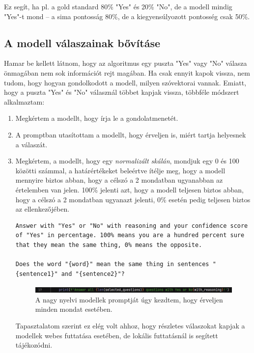 \documentclass[12pt]{report}
\theoremstyle{definition}
\begin{document}
Ez segít, ha pl. a gold standard 80\% "Yes" és 20\% "No", de a modell mindig "Yes"-t mond – a sima pontosság 80\%, de a kiegyensúlyozott pontosség csak 50\%.

\lstset{breaklines=true}

\subsection{A modell válaszainak bővításe}
Hamar be kellett látnom, hogy az algoritmus egy puszta "Yes" vagy "No" válasza önmagában nem sok információt rejt magában. Ha csak ennyit kapok vissza, nem tudom, hogy hogyan gondolkodott a modell, milyen szóvektorai vannak.
Emiatt, hogy a puszta "Yes" és "No" válasznál többet kapjak vissza, többféle módszert alkalmaztam:
\begin{enumerate}
    \item Megkértem a modellt, hogy írja le a gondolatmenetét.
	\item A promptban utasítottam a modellt, hogy érveljen is, miért tartja helyesnek a válaszát.
        \item Megkértem, a modellt, hogy egy \textit{normalizált skálán}, mondjuk egy 0 és 100 közötti számmal, a határértékeket beleértve ítélje meg, hogy a modell mennyire biztos abban, hogy a célszó a 2 mondatban ugyanabban az értelemben van jelen. 100\% jelenti azt, hogy a modell teljesen biztos abban, hogy a célszó a 2 mondatban ugyanazt jelenti, 0\% esetén pedig teljesen biztos az ellenkezőjében.
	      \begin{lstlisting}
Answer with "Yes" or "No" with reasoning and your confidence score of "Yes" in percentage. 100% means you are a hundred percent sure that they mean the same thing, 0% means the opposite.

Does the word "{word}" mean the same thing in sentences "{sentence1}" and "{sentence2}"?
\end{lstlisting}


	      \begin{figure}[H]
	      	\centering
	      	\includegraphics[width=1\linewidth]{graphics/Answer-all-questions-with-reasoning.png}
	      	\caption{A nagy nyelvi modellek promptját úgy kezdtem, hogy érveljen minden mondat esetében.}
	      	\label{fig:enter-label1}
	      \end{figure}
 Tapasztalatom szerint ez elég volt ahhoz, hogy részletes válaszokat kapjak a modellek webes futtatása esetében, de lokális futtatásnál is segített tájékozódni.
\end{enumerate}
\end{document}
